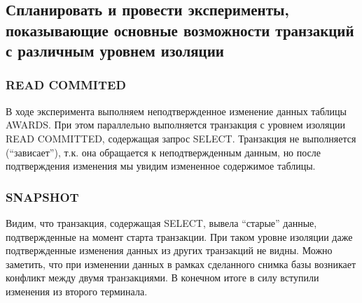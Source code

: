 \subsection{Спланировать и провести эксперименты, показывающие основные возможности транзакций с различным уровнем изоляции}

\subsubsection{READ COMMITED}





В ходе эксперимента выполняем неподтвержденное изменение данных таблицы AWARDS. При этом параллельно выполняется транзакция с уровнем изоляции READ COMMITTED, содержащая запрос SELECT. Транзакция не выполняется ("`зависает"'), т.к. она обращается к неподтвержденным данным, но после подтверждения изменения мы увидим измененное содержимое таблицы. 

\subsubsection{SNAPSHOT}





Видим, что транзакция, содержащая SELECT, вывела "`старые"' данные, подтвержденные на момент старта транзакции. При таком уровне изоляции даже подтвержденные изменения данных из других транзакций не видны. Можно заметить, что при изменении данных в рамках сделанного снимка базы возникает конфликт между двумя транзакциями. В конечном итоге в силу вступили изменения из второго терминала. 

